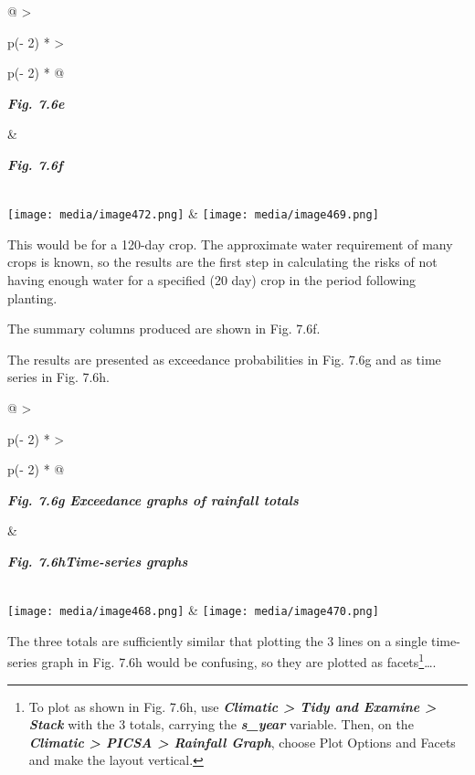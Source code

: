 \documentclass[
  letterpaper,
  DIV=11,
  numbers=noendperiod]{scrreprt}
\begin{document}
\begin{longtable}[]{@{}
  >{\raggedright\arraybackslash}p{(\columnwidth - 2\tabcolsep) * }
  >{\raggedright\arraybackslash}p{(\columnwidth - 2\tabcolsep) * }@{}}
\toprule\noalign{}
\begin{minipage}[b]{\linewidth}\raggedright
\textbf{\emph{Fig. 7.6e}}
\end{minipage} & \begin{minipage}[b]{\linewidth}\raggedright
\textbf{\emph{Fig. 7.6f}}
\end{minipage} \\
\midrule\noalign{}
\endhead
\bottomrule\noalign{}
\endlastfoot
\texttt{[image: media/image472.png]} &
\texttt{[image: media/image469.png]} \\
\end{longtable}

This would be for a 120-day crop. The approximate water requirement of
many crops is known, so the results are the first step in calculating
the risks of not having enough water for a specified (20 day) crop in
the period following planting.

The summary columns produced are shown in Fig. 7.6f.

The results are presented as exceedance probabilities in Fig. 7.6g and
as time series in Fig. 7.6h.

\begin{longtable}[]{@{}
  >{\raggedright\arraybackslash}p{(\columnwidth - 2\tabcolsep) * }
  >{\raggedright\arraybackslash}p{(\columnwidth - 2\tabcolsep) * }@{}}
\toprule\noalign{}
\begin{minipage}[b]{\linewidth}\raggedright
\textbf{\emph{Fig. 7.6g Exceedance graphs of rainfall totals}}
\end{minipage} & \begin{minipage}[b]{\linewidth}\raggedright
\textbf{\emph{Fig. 7.6hTime-series graphs}}
\end{minipage} \\
\midrule\noalign{}
\endhead
\bottomrule\noalign{}
\endlastfoot
\texttt{[image: media/image468.png]} &
\texttt{[image: media/image470.png]} \\
\end{longtable}

The three totals are sufficiently similar that plotting the 3 lines on a
single time-series graph in Fig. 7.6h would be confusing, so they are
plotted as facets\footnote{To plot as shown in Fig. 7.6h, use
  \textbf{\emph{Climatic \textgreater{} Tidy and Examine \textgreater{}
  Stack}} with the 3 totals, carrying the \textbf{\emph{s\_year}}
  variable. Then, on the \textbf{\emph{Climatic \textgreater{} PICSA
  \textgreater{} Rainfall Graph}}, choose Plot Options and Facets and
  make the layout vertical.}\ldots.
\end{document}
